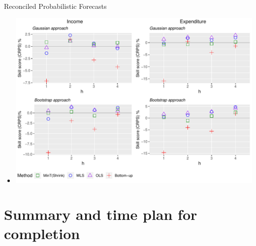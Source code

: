 \documentclass[11pt,xcolor=dvipsnames,handout]{beamer} %
\begin{document}
\begin{frame}{Reconciled Probabilistic Forecasts}
\begin{itemize}[<+-| alert@+>]
	\item[] 
	\tiny
	\centering
	\includegraphics[scale=0.55]{Figs/Results/ProbF_UnivS.pdf}
	
	
\end{itemize}
\end{frame}





\section{Summary and time plan for completion}

\end{document}
